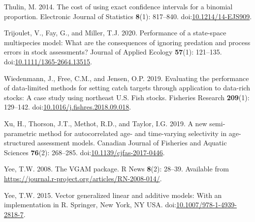 \documentclass[
  12pt,
]{article}
\newlength{\cslhangindent}
\newlength{\cslentryspacingunit} %
\newenvironment{CSLReferences}[2] %
 {%
  \setlength{\parindent}{0pt}
  \ifodd #1
  \let\oldpar\par
  \def\par{\hangindent=\cslhangindent\oldpar}
  \fi
  \setlength{\parskip}{#2\cslentryspacingunit}
 }%
 {}
\begin{document}
\begin{CSLReferences}{1}{0}
\leavevmode{}%
Thulin, M. 2014. {The cost of using exact confidence intervals for a
binomial proportion}. Electronic Journal of Statistics \textbf{8}(1):
817--840.
doi:\href{https://doi.org/10.1214/14-EJS909}{10.1214/14-EJS909}.

\leavevmode{}%
Trijoulet, V., Fay, G., and Miller, T.J. 2020. Performance of a
state-space multispecies model: What are the consequences of ignoring
predation and process errors in stock assessments? Journal of Applied
Ecology \textbf{57}(1): 121--135.
doi:\href{https://doi.org/10.1111/1365-2664.13515}{10.1111/1365-2664.13515}.

\leavevmode{}%
Wiedenmann, J., Free, C.M., and Jensen, O.P. 2019. Evaluating the
performance of data-limited methods for setting catch targets through
application to data-rich stocks: A case study using northeast {U.S.}
Fish stocks. Fisheries Research \textbf{209}(1): 129--142.
doi:\href{https://doi.org/10.1016/j.fishres.2018.09.018}{10.1016/j.fishres.2018.09.018}.

\leavevmode{}%
Xu, H., Thorson, J.T., Methot, R.D., and Taylor, I.G. 2019. A new
semi-parametric method for autocorrelated age- and time-varying
selectivity in age-structured assessment models. Canadian Journal of
Fisheries and Aquatic Sciences \textbf{76}(2): 268--285.
doi:\href{https://doi.org/10.1139/cjfas-2017-0446}{10.1139/cjfas-2017-0446}.

\leavevmode{}%
Yee, T.W. 2008. The {VGAM} package. R News \textbf{8}(2): 28--39.
Available from
\url{https://journal.r-project.org/articles/RN-2008-014/}.

\leavevmode{}%
Yee, T.W. 2015. Vector generalized linear and additive models: With an
implementation in {R}. Springer, New York, NY USA.
doi:\href{https://doi.org/10.1007/978-1-4939-2818-7}{10.1007/978-1-4939-2818-7}.

\end{CSLReferences}

\pagebreak

\clearpage
\end{document}
